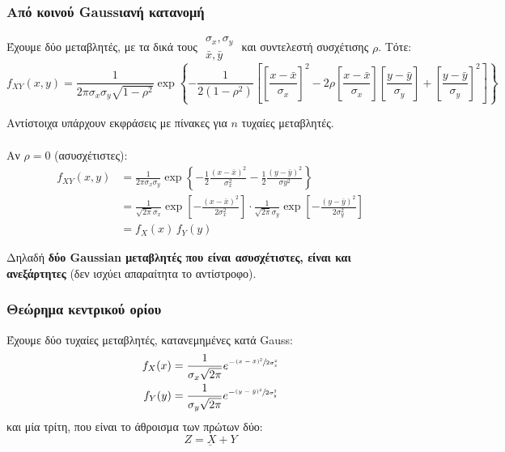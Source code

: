 \documentclass[11pt,a4paper,notitlepage,fleqn,final]{article}
\begin{document}
\subsubsection{Από κοινού Gaussιανή κατανομή}
Έχουμε δύο μεταβλητές, με τα δικά τους \( \begin{matrix}
\sigma_x,\sigma_y \\ \bar x,\bar y
\end{matrix} \) και συντελεστή συσχέτισης \( \rho \). Τότε:
\[
	f_{XY}(x,y) = \frac{1}{2\pi \sigma_x \sigma_y \sqrt{1-\rho^2}}
	\exp\left\lbrace 
	-\frac{1}{2(1-\rho^2)}\left[
	\left[
	\frac{x-\bar x}{\sigma_x}
	\right]^2 - 2\rho\left[\frac{x-\bar x}{\sigma_x}\right]\left[
	\frac{y-\bar y}{\sigma_y}
	\right] + \left[\frac{y-\bar y}{\sigma_y}\right]^2
	\right]
	 \right\rbrace
\]

Αντίστοιχα υπάρχουν εκφράσεις με πίνακες για \( n \) τυχαίες μεταβλητές.

\paragraph{}Αν \( \rho = 0 \) (ασυσχέτιστες):
\begin{align*}
f_{XY}(x,y) &= \frac{1}{2\pi \sigma_x\sigma_y}\exp \left\lbrace 
-\frac{1}{2}\frac{(x-\bar x)^2}{\sigma_x^2}
-\frac{1}{2}\frac{(y-\bar y)^2}{\sigma y^2}
 \right\rbrace \\ &=
 \frac{1}{\sqrt{2\pi} \sigma_x}\exp\left[
 -\frac{(x-\bar x)^2}{2\sigma_x^2}\right]
 \cdot\frac{1}{\sqrt{2\pi}\sigma_y}\exp\left[
 -\frac{(y-\bar y)^2}{2\sigma_y^2}\right]
 \\ &= f_X(x) \, f_Y(y)
\end{align*}

Δηλαδή \textbf{δύο Gaussian μεταβλητές που είναι ασυσχέτιστες, είναι και
	ανεξάρτητες} (δεν ισχύει απαραίτητα το αντίστροφο).

\subsubsection{Θεώρημα κεντρικού ορίου}
Έχουμε δύο τυχαίες μεταβλητές, κατανεμημένες κατά Gauss:
\begin{align*}
	f_X(x) &= \frac{1}{\sigma_x \sqrt{2\pi}}
	e^{-\sfrac{(x-\bar x)^2}{2\sigma_x^2} } \\
	f_Y(y) &= \frac{1}{\sigma_y\sqrt{2\pi}}
	e^{-\sfrac{(y-\bar y)^2}{2\sigma_y^2} }
\end{align*}
και μία τρίτη, που είναι το άθροισμα των πρώτων δύο:
\[
\underline{Z=X+Y}
\]
\end{document}
